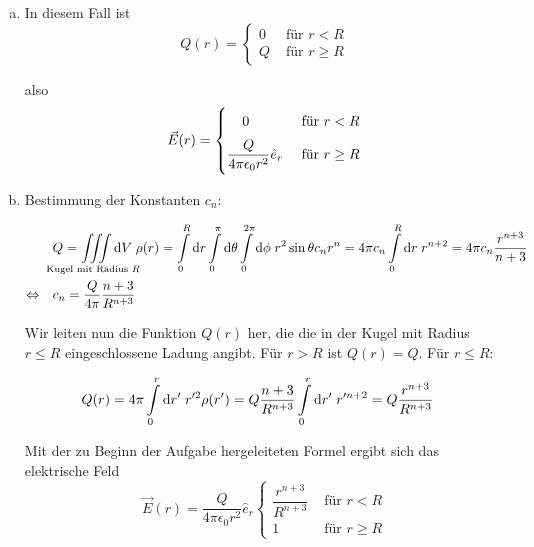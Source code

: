 \documentclass[a4paper,german,12pt,smallheadings]{scrartcl}
\begin{document}
\begin{enumerate}[a)]
  \item
    In diesem Fall ist
    \begin{equation}
      Q(r) = \begin{cases}
        0 & \text{ für } r < R \\
        Q & \text{ für } r \ge R
      \end{cases}
    \end{equation}

    also
    \begin{equation}
      \vec{E}(r) = \begin{cases}
        \; \; \; \; 0 & \text{ für } r < R
        \vspace{0.2 cm} \\
        \dfrac{Q}{4 \pi \epsilon_0 r^2} \hat{e}_r & \text{ für } r \ge R
      \end{cases}
    \end{equation}
  \item
    Bestimmung der Konstanten $c_n$:

    \begin{align}
      &Q = \iiint\limits_{\mathclap{\text{Kugel mit Radius $R$}}} \dif V \; \rho(r)
      = \int\limits_0^R \dif r \int\limits_0^\pi \dif \theta \int\limits_0^{2 \pi} \dif \phi \; r^2 \sin \theta c_n r^n
      = 4 \pi c_n \int\limits_0^R \dif r \; r^{n+2}
      = 4 \pi c_n \frac{r^{n+3}}{n+3} \\
      \Leftrightarrow\quad
      &c_n = \frac{Q}{4 \pi} \frac{n+3}{R^{n+3}}
    \end{align}

    Wir leiten nun die Funktion $Q(r)$ her, die die in der Kugel mit Radius $r
    \le R$ eingeschlossene Ladung angibt. Für $r > R$ ist $Q(r) = Q$. Für $r \le R$:

    \begin{align}
      &Q(r) = 4 \pi \int\limits_0^r \dif r' \; r'^2 \rho(r') = Q \frac{n+3}{R^{n+3}} \int\limits_0^r \dif r' \; r'^{n+2} = Q \frac{r^{n+3}}{R^{n+3}}
    \end{align}

    Mit der zu Beginn der Aufgabe hergeleiteten Formel ergibt sich das elektrische Feld
    \begin{equation}
      \vec{E}(r) = \dfrac{Q}{4 \pi \epsilon_0 r^2} \hat{e}_r \begin{cases}
        \dfrac{r^{n+3}}{R^{n+3}} & \text{ für } r < R \\
        1 & \text{ für } r \ge R
      \end{cases}
    \end{equation}


\end{enumerate}
\end{document}
